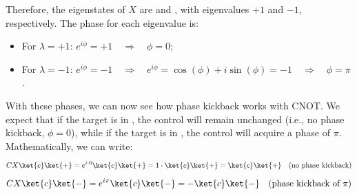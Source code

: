 Therefore, the eigenstates of $X$ are \ket{+} and \ket{-}, with eigenvalues $+1$ and $-1$, respectively. The phase for each eigenvalue is:
\begin{itemize}
    \item For $\lambda = +1$: $e^{i\phi} = +1 \quad \Rightarrow \quad \phi = 0$;
    \item For $\lambda = -1$: $e^{i\phi} = -1 \quad \Rightarrow \quad e^{i\phi} = \cos (\phi) + i \sin (\phi) = -1 \quad \Rightarrow \quad \phi = \pi$.
\end{itemize}
With these phases, we can now see how phase kickback works with CNOT. We expect that if the target is in \ket{+}, the control will remain unchanged (i.e., no phase kickback, $\phi = 0$), while if the target is in \ket{-}, the control will acquire a phase of $\pi$. Mathematically, we can write:
\begin{equation*}
    CX\ket{c}\ket{+} = e^{i \cdot 0}\ket{c}\ket{+} = 1 \cdot \ket{c}\ket{+} = \ket{c}\ket{+} \quad \text{(no phase kickback)}
\end{equation*}
\begin{equation*}
    CX\ket{c}\ket{-} = e^{i\pi}\ket{c}\ket{-} = -\ket{c}\ket{-} \quad \text{(phase kickback of $\pi$)}
\end{equation*}

